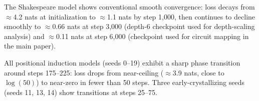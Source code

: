 The Shakespeare model shows conventional smooth convergence: loss decays from $\approx$4.2 nats
at initialization to $\approx$1.1 nats by step 1,000, then continues to decline smoothly to
$\approx$0.66 nats at step 3,000 (depth-6 checkpoint used for depth-scaling analysis) and
$\approx$0.11 nats at step 6,000 (checkpoint used for circuit mapping in the main paper).

All positional induction models (seeds 0--19) exhibit a sharp phase transition around steps
175--225: loss drops from near-ceiling ($\approx$3.9 nats, close to $\log(50)$) to near-zero
in fewer than 50 steps. Three early-crystallizing seeds (seeds 11, 13, 14) show transitions
at steps 25--75.
